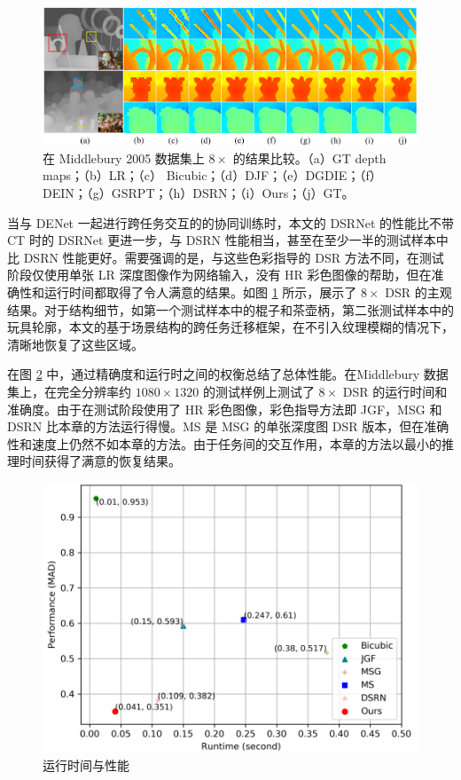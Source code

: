 \documentclass{vip-theme}
\begin{document}
\begin{sloppypar}
\begin{figure}[!htbp]
	\centering
	\centerline{\includegraphics[width=1\linewidth]{figure/compar.png}}
	\caption{在 Middlebury 2005 数据集上 $8 \times$ 的结果比较。（a）GT depth maps；（b）LR；（c）
Bicubic；（d）DJF；（e）DGDIE；（f）DEIN；（g）GSRPT；（h）DSRN；（i）Ours；（j）GT。}
	\label{fig:compar}
\end{figure}

当与 DENet 一起进行跨任务交互的的协同训练时，本文的 DSRNet 的性能比不带 CT 时的 DSRNet 更进一步，与 DSRN 性能相当，甚至在至少一半的测试样本中比 DSRN 性能更好。需要强调的是，与这些色彩指导的 DSR 方法不同，在测试阶段仅使用单张 LR 深度图像作为网络输入，没有 HR 彩色图像的帮助，但在准确性和运行时间都取得了令人满意的结果。如图 \ref{fig:compar} 所示，展示了 $8 \times$ DSR 的主观结果。对于结构细节，如第一个测试样本中的棍子和茶壶柄，第二张测试样本中的玩具轮廓，本文的基于场景结构的跨任务迁移框架，在不引入纹理模糊的情况下，清晰地恢复了这些区域。

在图 \ref{fig:run_time} 中，通过精确度和运行时之间的权衡总结了总体性能。在Middlebury 数据集上，在完全分辨率约 $1080 \times 1320$ 的测试样例上测试了 $8 \times$ DSR 的运行时间和准确度。由于在测试阶段使用了 HR 彩色图像，彩色指导方法即 JGF，MSG 和 DSRN 比本章的方法运行得慢。MS 是 MSG 的单张深度图 DSR 版本，但在准确性和速度上仍然不如本章的方法。由于任务间的交互作用，本章的方法以最小的推理时间获得了满意的恢复结果。

\begin{figure}[!htbp]
	\centering
	\centerline{\includegraphics[width=0.95\linewidth]{figure/run_time.png}}
	\caption{运行时间与性能}
	\label{fig:run_time}
\end{figure}

\end{sloppypar}
\end{document}
